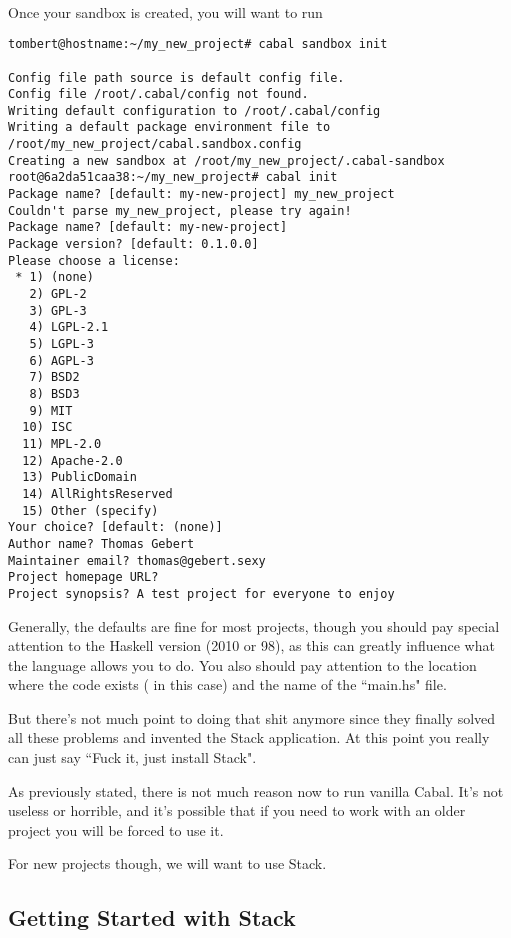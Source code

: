 \paragraph{}
Once your sandbox is created, you will want to run 

\begin{verbatim}
tombert@hostname:~/my_new_project# cabal sandbox init

Config file path source is default config file.
Config file /root/.cabal/config not found.
Writing default configuration to /root/.cabal/config 
Writing a default package environment file to
/root/my_new_project/cabal.sandbox.config
Creating a new sandbox at /root/my_new_project/.cabal-sandbox
root@6a2da51caa38:~/my_new_project# cabal init
Package name? [default: my-new-project] my_new_project 
Couldn't parse my_new_project, please try again!
Package name? [default: my-new-project]
Package version? [default: 0.1.0.0] 
Please choose a license:
 * 1) (none)        
   2) GPL-2
   3) GPL-3
   4) LGPL-2.1
   5) LGPL-3
   6) AGPL-3
   7) BSD2
   8) BSD3
   9) MIT
  10) ISC
  11) MPL-2.0
  12) Apache-2.0
  13) PublicDomain
  14) AllRightsReserved
  15) Other (specify)
Your choice? [default: (none)]
Author name? Thomas Gebert
Maintainer email? thomas@gebert.sexy
Project homepage URL?
Project synopsis? A test project for everyone to enjoy

\end{verbatim}

Generally, the defaults are fine for most projects, though you should pay special attention to the Haskell version (2010 or 98), as this can greatly influence what the language allows you to do.  You also should pay attention to the location where the code exists ( in this case) and the name of the ``main.hs" file. 

But there's not much point to doing that shit anymore since they finally solved all these problems and invented the Stack application.  At this point you really can just say ``Fuck it, just install Stack". 

As previously stated, there is not much reason now to run vanilla Cabal.  It's not useless or horrible, and it's possible that if you need to work with an older project you will be forced to use it. 

For new projects though, we will want to use Stack.

\subsection{Getting Started with Stack}

